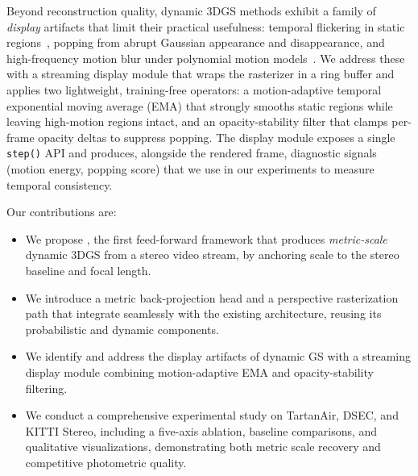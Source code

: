 Beyond reconstruction quality, dynamic 3DGS methods exhibit a family of
\emph{display} artifacts that limit their practical usefulness: temporal
flickering in static regions~\cite{yun2025compensating}, popping from
abrupt Gaussian appearance and disappearance, and high-frequency motion
blur under polynomial motion models~\cite{zhang2026fastgs}. We address
these with a streaming display module that wraps the rasterizer in a ring
buffer and applies two lightweight, training-free operators: a
motion-adaptive temporal exponential moving average (EMA) that strongly
smooths static regions while leaving high-motion regions intact, and an
opacity-stability filter that clamps per-frame opacity deltas to suppress
popping. The display module exposes a single \texttt{step()} API and
produces, alongside the rendered frame, diagnostic signals (motion energy,
popping score) that we use in our experiments to measure temporal
consistency.

Our contributions are:
\begin{itemize}[leftmargin=*,topsep=2pt,itemsep=1pt]
    \item We propose \StereoSplat, the first feed-forward framework that
    produces \emph{metric-scale} dynamic 3DGS from a stereo video stream,
    by anchoring scale to the stereo baseline and focal length.
    \item We introduce a metric back-projection head and a perspective
    rasterization path that integrate seamlessly with the existing
    \StreamSplat architecture, reusing its probabilistic and dynamic
    components.
    \item We identify and address the display artifacts of dynamic GS with
    a streaming display module combining motion-adaptive EMA and
    opacity-stability filtering.
    \item We conduct a comprehensive experimental study on TartanAir,
    DSEC, and KITTI Stereo, including a five-axis ablation, baseline
    comparisons, and qualitative visualizations, demonstrating both metric
    scale recovery and competitive photometric quality.
\end{itemize}
